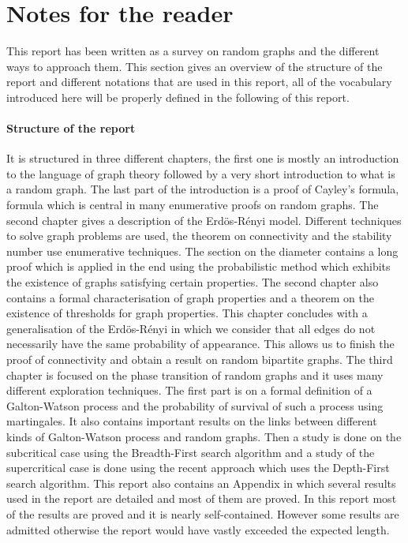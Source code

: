 \newtheorem{theorem}{Theorem}[section]
\newtheorem{corollary}{Corollary}[theorem]
\newtheorem{lemma}[theorem]{Lemma}
\section{Notes for the reader}
This report has been written as a survey on random graphs and the different ways to approach them.
This section gives an overview of the structure of the report and different notations that are used in this report, all of the vocabulary introduced here will be properly defined in the following of this report.
\paragraph{Structure of the report}
It is structured in three different chapters, the first one is mostly an introduction to the language of graph theory followed by a very short introduction to what is a random graph.
The last part of the introduction is a proof of Cayley's formula, formula which is central in many enumerative proofs on random graphs.
\newline
The second chapter gives a description of the Erd\"os-R\'enyi model. 
Different techniques to solve graph problems are used, the theorem on connectivity and the stability number use enumerative techniques. 
The section on the diameter contains a long proof which is applied in the end using the probabilistic method which exhibits the existence of graphs satisfying certain properties.
The second chapter also contains a formal characterisation of graph properties and a theorem on the existence of thresholds for graph properties.
This chapter concludes with a generalisation of the Erd\"os-R\'enyi in which we consider that all edges do not necessarily have the same probability of appearance.
This allows us to finish the proof of connectivity and obtain a result on random bipartite graphs.
\newline
The third chapter is focused on the phase transition of random graphs and it uses many different exploration techniques.
The first part is on a formal definition of a Galton-Watson process and the probability of survival of such a process using martingales.
It also contains important results on the links between different kinds of Galton-Watson process and random graphs.
Then a study is done on the subcritical case using the Breadth-First search algorithm and a study of the supercritical case 
is done using the recent approach which uses the Depth-First search algorithm.
\newline
This report also contains an Appendix in which several results used in the report are detailed and most of them are proved.
\newline
In this report most of the results are proved and it is nearly self-contained.
However some results are admitted otherwise the report would have vastly exceeded the expected length.
